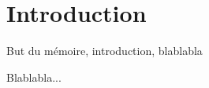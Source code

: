 % 			 
%
%

\chapter{Introduction}
\setcounter{page}{1}
\label{introduction}

\color{red}
But du mémoire, introduction, blablabla

Blablabla...
\color{black}
\cite{kulmer2017using}
